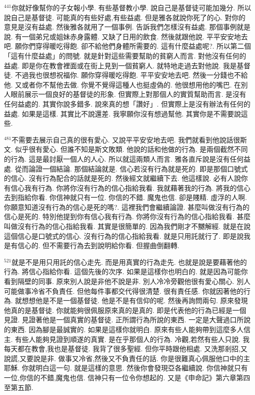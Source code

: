 \documentclass{book}
\begin{document}
$^{441}$你就好像幫你的子女報小學.
有些基督教小學.
說自己是基督徒可能加幾分.
所以說自己是基督徒.
可能真的有些好處,有些益處.
但是雅各就說你死了的心.
對你的意見是沒有益處.
然後雅各就用了一個事例.
告訴我們怎樣沒有益處.
那個事例就是說.
有一個弟兄或姐妹赤身露體.
又缺了日用的飲食.
然後就跟他說.
平平安安地去吧.
願你們穿得暖吃得飽.
卻不給他們身體所需要的.
這有什麼益處呢?.
所以第二個「這有什麼益處」的問號.
就是針對這些需要幫助的貧窮人而言.
對他沒有任何的益處.
即是你在教會裡面或在街上見到一個貧窮人.
就特地走過去對他說.
我是基督徒.
不過我也很想祝福你.
願你穿得暖吃得飽.
平平安安地去吧.
然後一分錢也不給他.
又或者你不幫他去做.
你覺不覺得這種人也挺虛偽的.
他很想用他的嘴巴.
在別人眼前展示一個良好的基督徒的形象.
但實際上對那個人的實質幫助而言.
是沒有任何益處的.
其實你說多錯多.
說來真的想「讚好」.
但實際上是沒有辦法有任何的益處.
如果是這樣.
其實比不說還差.
我寧願你沒有想過幫他.
其實你是不需要說這些.

$^{481}$不需要去展示自己真的很有愛心.
又說平平安安地去吧.
我們就看到他說話很斯文.
似乎很有愛心.
但誰不知是斯文敗類.
他說的話和他做的行為.
是兩個截然不同的行為.
這是最討厭一個人的人心.
所以就這兩類人而言.
雅各直斥說是沒有任何益處.
從而論證一個結論.
那個結論就是.
信心若沒有行為就是死的.
即是那個口號式的信心.
沒有行為配合的話就是死的.
然後經文就繼續下去.
他這樣說.
必有人說你有信心我有行為.
你將你沒有行為的信心指給我看.
我就藉著我的行為.
將我的信心去到指給你看.
你信神就只有一位.
你信的不錯.
魔鬼也信.
卻是賤精.
虛浮的人啊.
你願意知道沒有行為的信心是死的嗎?.
這裡我們會繼續論證.
甚麼叫做沒有行為的信心是死的.
特別他提到你有信心我有行為.
你將你沒有行為的信心指給我看.
甚麼叫做沒有行為的信心指給我看.
其實是很簡單的.
因為我們剛才不嬲解經.
就是在說這個信心是口號式的信心.
沒有行為的信心指給我看.
就是只用託就行了.
即是說我是有信心的.
但不需要行為去到說明給你看.
但握曲倒翻轉.

$^{521}$就是不是用只用託的信心走先.
而是用真實的行為走先.
也就是說是要藉著他的行為.
將信心指給你看.
這個先後的次序.
如果是這樣你也明白的.
就是因為可能你看到隔壁的同事.
原來別人說是非他不說是非.
別人冷冷旁觀他很有愛心關心.
別人可能做事冷省不負責任.
但他每件事都交代得很清楚.
很有責任感.
你就因著他的行為.
就想想他是不是一個基督徒.
他是不是有信仰的呢.
然後再詢問兩句.
原來發現他真的是基督徒.
你就能夠很佩服原來真的是真的.
即是代表他的行為已經是一個見證.
見證著他是一個真實的基督徒.
正所謂行為所說的東西.
一定是大聲過口所說的東西.
因為腳是最誠實的.
如果是這樣你就明白.
原來有些人能夠帶到這麼多人信主.
有些人能夠見證到順遂的真實.
是在乎那個人的行為.
冷觀,若然有些人只說.
我每天都在教會,我也是基督徒.
我背了很多聖經.
但你平時跟他相處.
又洗那剎招,又說謊,又要說是非.
做事又冷省,然後又不負責任的話.
你是很難真心佩服他口中的主耶穌.
你就明白這一句.
就是這樣的意思.
然後你會發現亞各繼續說.
你信神就只有一位,你信的不錯,魔鬼也信.
信神只有一位令你想起的.
又是《申命記》第六章第四至第五節.
\end{document}
